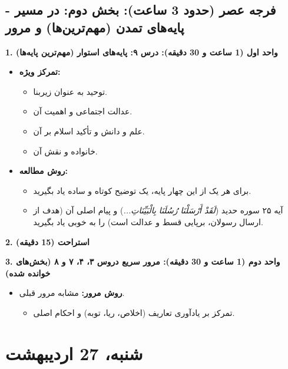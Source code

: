 \documentclass[12pt,a4paper]{article}
\newcommand{\quranverse}[1]{\textit{#1}}
\newcommand{\sectionbreak}{\noindent\hrulefill\par\vspace{0.5em}}
\begin{document}
\sectionbreak
\vspace{1em}

\subsection*{فرجه عصر (حدود 3 ساعت): بخش دوم: در مسیر - پایه‌های تمدن (مهم‌ترین‌ها) و مرور}

\textbf{1. واحد اول (1 ساعت و 30 دقیقه): درس ۹: پایه‌های استوار (مهم‌ترین پایه‌ها)}
\begin{itemize}
    \item \textbf{تمرکز ویژه:}
    \begin{itemize}
        \item توحید به عنوان زیربنا.
        \item عدالت اجتماعی و اهمیت آن.
        \item علم و دانش و تأکید اسلام بر آن.
        \item خانواده و نقش آن.
    \end{itemize}
    \item \textbf{روش مطالعه:}
    \begin{itemize}
        \item برای هر یک از این چهار پایه، یک توضیح کوتاه و ساده یاد بگیرید.
        \item آیه ۲۵ سوره حدید (\quranverse{لَقَدْ أَرْسَلْنَا رُسُلَنَا بِالْبَیِّنَاتِ...}) و پیام اصلی آن (هدف از ارسال رسولان، برپایی قسط و عدالت است) را به خوبی یاد بگیرید.
    \end{itemize}
\end{itemize}

\textbf{2. استراحت (15 دقیقه)}
\vspace{0.5em}

\textbf{3. واحد دوم (1 ساعت و 30 دقیقه): مرور سریع دروس ۳، ۴، ۷ و ۸ (بخش‌های خوانده شده)}
\begin{itemize}
    \item \textbf{روش مرور:} مشابه مرور قبلی.
    \begin{itemize}
        \item تمرکز بر یادآوری تعاریف (اخلاص، ریا، توبه) و احکام اصلی.
    \end{itemize}
\end{itemize}

\pagebreak %
\section*{شنبه، 27 اردیبهشت}
\end{document}
